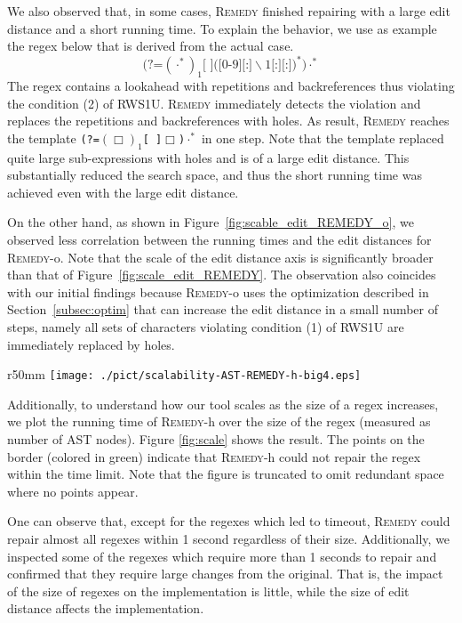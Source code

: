 \documentclass[conference]{IEEEtran}
\newcommand{\tool}{\textsc{Remedy}}
\newcommand{\hole}{\Box}
\newcommand{\any}{\cdot}
\newcommand{\ltp}{RWS1U}
\newcommand{\tchanged}[2]{#2}
\newcommand{\texcomment}[1]{}
\begin{document}
We also observed that, in \tchanged{one case}{some cases}, \tool{} finished repairing with a large edit distance and a short running time.  To explain the behavior, we use as example the regex below that is derived from the actual case.
\[
\texttt{(?=$(\any^*)_1$[ ]$([0$-$9][$:$]\backslash1[$:$][$:$])^*$)$\any^*$}
\]
The regex contains a lookahead with repetitions and backreferences thus violating the condition (2) of \ltp{}.  \tool{} immediately detects the violation and replaces the repetitions and backreferences with holes.  As result, \tool{} reaches the template \texttt{(?=$(\hole{})_1$[ ]$\hole{}$)$\any^*$} in one step.  Note that the template replaced quite large sub-expressions with holes and is of a large edit distance.  This substantially reduced the search space, and thus the short running time was achieved even with the large edit distance.


On the other hand, as shown in Figure~\ref{fig:scable_edit_REMEDY_o}, we observed less correlation between the running times and the edit distances for \tool{}-o.  Note that the scale of the edit distance axis is significantly broader than that of Figure~\ref{fig:scale_edit_REMEDY}.  The observation also coincides with our initial findings because \tool{}-o uses the optimization described in Section~\ref{subsec:optim} that can increase the edit distance in a small number of steps\tchanged{.}{, namely all sets of characters violating condition (1) of \ltp{} are immediately replaced by holes.}
\texcomment{
\tchanged{}{ For example, the points at edit distance $\sim$130 in Figure \ref{fig:scable_edit_REMEDY_o} are caused by the optimization regarding the condition (1) of \ltp{}. }
}

\begin{wrapfigure}{r}{50mm}\centering
\texttt{[image: ./pict/scalability-AST-REMEDY-h-big4.eps]}
\caption{Scalability wrt. regex sizes.}
    \label{fig:scale} 
\end{wrapfigure} Additionally, to understand how our tool scales as the size of a regex increases, we plot the running time of \tool{}-h over the size of the regex (measured as number of AST nodes).
Figure \ref{fig:scale} shows the result.
The points on the border (colored in green) indicate that \tool{}-h could not repair the regex within the time limit.
Note that the figure is truncated to omit redundant space where no points appear.


One can observe that, except for the regexes which led to timeout, \tool{} could repair almost all regexes within 1 second regardless of their size.
Additionally, we inspected some of the regexes which require more than 1 seconds to repair and confirmed that they require large changes from the original.
That is, the impact of the size of regexes on the implementation is little, while the size of edit distance affects the implementation.
\end{document}
